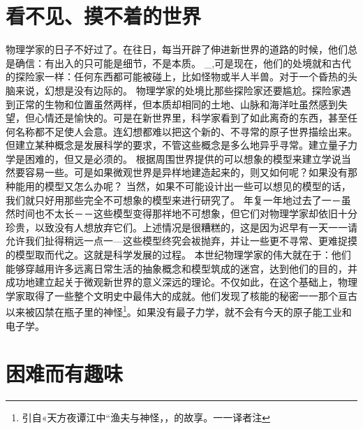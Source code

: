 \section{看不见、摸不着的世界}

物理学家的日子不好过了。在往日，每当开辟了伸进新世界的道路的时候，他们总是确信：有出入的只可能是细节，不是本质。
_,可是现在，他们的处境就和古代的探险家一样：任何东西都可能被碰上，比如怪物或半人半兽。对于一个昏热的头脑来说，幻想是没有边际的。
物理学家的处境比那些探险家还要尴尬。探险家遇到正常的生物和位置虽然两样，但本质却相同的土地、山脉和海洋吐虽然感到失望，但心情还是愉快的。可是在新世界里，科学家看到了如此离奇的东西，甚至任何名称都不足使人会意。连幻想都难以把这个新的、不寻常的原子世界描绘出来。
但建立某种概念是发展科学的要求，不管这些概念是多么地异乎寻常。建立量子力学是困难的，但又是必须的。
根据周围世界提供的可以想象的模型来建立学说当然要容易一些。可是如果微观世界是异样地建造起来的，则又如何呢？如果没有那种能用的模型又怎么办呢？
当然，如果不可能设计出一些可以想见的模型的话，我们就只好用那些完全不可想象的模型来进行研究了。
年复一年地过去了一－虽然时间也不太长－－这些模型变得那祥地不可想象，但它们对物理学家却依旧十分珍贵，以致没有人想放弃它们。上述情况是很糟糕的，这是因为迟早有一天一一请允许我们扯得稍远一点一—这些模型终究会袚抛弃，并让一些更不寻常、更难捉摸的模型取而代之。这就是科学发展的过程。
本世纪物理学家的伟大就在于：他们能够穿越用许多远离日常生活的抽象概念和模型筑成的迷宫，达到他们的目的，并成功地建立起关于微观新世界的意义深远的理论。不仅如此，在这个基础上，物理学家取得了一些整个文明史中最伟大的成就。他们发现了核能的秘密一一那个亘古以来被囚禁在瓶子里的神怪\footnote{引自«天方夜谭江中“渔夫与神怪，，的故享。一一译者注}。如果没有最子力学，就不会有今天的原子能工业和电子学。

\section{困难而有趣味}

